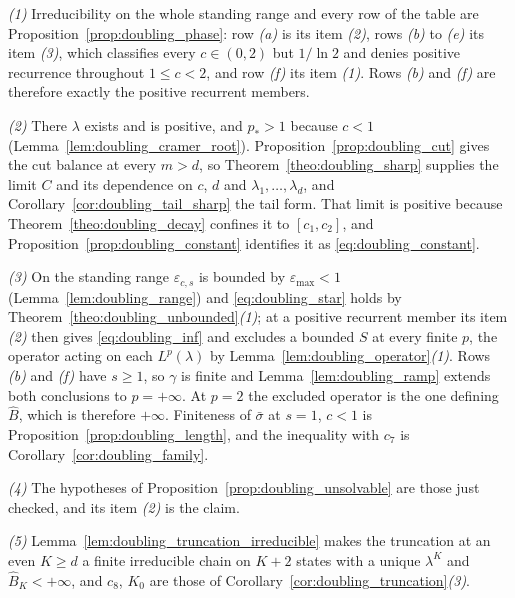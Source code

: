 \emph{(1)} Irreducibility on the whole standing range and every row of the table are
Proposition~\ref{prop:doubling_phase}: row \emph{(a)} is its item \emph{(2)}, rows \emph{(b)}
to \emph{(e)} its item \emph{(3)}, which classifies every $c\in(0,2)$ but $1/\ln2$ and denies
positive recurrence throughout $1\leq c<2$, and row \emph{(f)} its item \emph{(1)}. Rows
\emph{(b)} and \emph{(f)} are therefore exactly the positive recurrent members.

\emph{(2)} There $\lambda$ exists and is positive, and $p_*>1$ because $c<1$
(Lemma~\ref{lem:doubling_cramer_root}). Proposition~\ref{prop:doubling_cut} gives the cut
balance at every $m>d$, so Theorem~\ref{theo:doubling_sharp} supplies the limit $C$ and its
dependence on $c$, $d$ and $\lambda_1,\dots,\lambda_d$, and
Corollary~\ref{cor:doubling_tail_sharp} the tail form. That limit is positive because
Theorem~\ref{theo:doubling_decay} confines it to $[c_1,c_2]$, and
Proposition~\ref{prop:doubling_constant} identifies it as \eqref{eq:doubling_constant}.

\emph{(3)} On the standing range $\varepsilon_{c,s}$ is bounded by
$\varepsilon_{\max}<1$ (Lemma~\ref{lem:doubling_range}) and \eqref{eq:doubling_star} holds by
Theorem~\ref{theo:doubling_unbounded}\emph{(1)}; at a positive recurrent member its item
\emph{(2)} then gives \eqref{eq:doubling_inf} and excludes a bounded $S$ at every finite $p$,
the operator acting on each $L^p(\lambda)$ by Lemma~\ref{lem:doubling_operator}\emph{(1)}.
Rows \emph{(b)} and \emph{(f)} have $s\geq1$, so $\gamma$ is finite and
Lemma~\ref{lem:doubling_ramp} extends both conclusions to $p=+\infty$. At $p=2$ the excluded
operator is the one defining $\widehat B$, which is therefore $+\infty$. Finiteness of
$\bar\sigma$ at $s=1$, $c<1$ is Proposition~\ref{prop:doubling_length}, and the inequality with
$c_7$ is Corollary~\ref{cor:doubling_family}.

\emph{(4)} The hypotheses of Proposition~\ref{prop:doubling_unsolvable} are those just
checked, and its item \emph{(2)} is the claim.

\emph{(5)} Lemma~\ref{lem:doubling_truncation_irreducible} makes the truncation at an even
$K\geq d$ a finite irreducible chain on $K+2$ states with a unique $\lambda^K$ and
$\widehat B_K<+\infty$, and $c_8$, $K_0$ are those of
Corollary~\ref{cor:doubling_truncation}\emph{(3)}.
